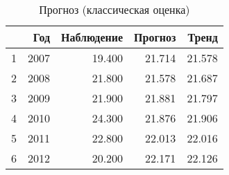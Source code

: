 \begin{table}[ht]
\centering
\begin{tabular}{rrrrr}
  \hline
 & Год & Наблюдение & Прогноз & Тренд \\ 
  \hline
1 & 2007 & 19.400 & 21.714 & 21.578 \\ 
  2 & 2008 & 21.800 & 21.578 & 21.687 \\ 
  3 & 2009 & 21.900 & 21.881 & 21.797 \\ 
  4 & 2010 & 24.300 & 21.876 & 21.906 \\ 
  5 & 2011 & 22.800 & 22.013 & 22.016 \\ 
  6 & 2012 & 20.200 & 22.171 & 22.126 \\ 
   \hline
\end{tabular}
\caption{Прогноз (классическая оценка)} 
\label{table:classical-prediction}
\end{table}
